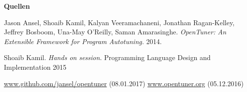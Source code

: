 \begin{frame}

  \textbf{Quellen \newline}
      
  \begin{thebibliography}{9}

   
   
   Jason Ansel, Shoaib Kamil, Kalyan Veeramachaneni, Jonathan Ragan-Kelley, Jeffrey Bosboom, Una-May O'Reilly, Saman Amarasinghe. \emph{OpenTuner: An Extensible Framework for Program Autotuning.}
    2014.
    
  
   Shoaib Kamil. \emph{Hands on session.} Programming Language Design and Implementation 2015
  
   \url{www.github.com/jansel/opentuner} \footnotesize (08.01.2017)
  \normalsize
   \url{www.opentuner.org} \footnotesize (05.12.2016)
  

  \end{thebibliography}

\end{frame}
\endgroup


